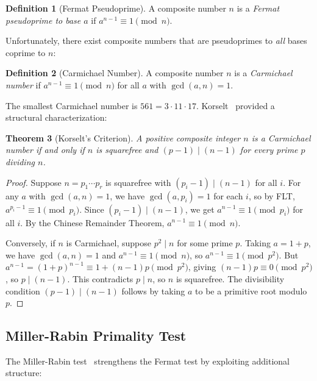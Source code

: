 \documentclass{amsart}
\theoremstyle{plain}
\newtheorem{theorem}{Theorem}[section]
\theoremstyle{definition}
\newtheorem{definition}[theorem]{Definition}
\theoremstyle{remark}
\begin{document}
\begin{definition}[Fermat Pseudoprime]
A composite number $n$ is a \emph{Fermat pseudoprime to base $a$} if $a^{n-1} \equiv 1 \pmod{n}$.
\end{definition}

Unfortunately, there exist composite numbers that are pseudoprimes to \emph{all} bases coprime to $n$:

\begin{definition}[Carmichael Number]\label{def:carmichael}
A composite number $n$ is a \emph{Carmichael number} if $a^{n-1} \equiv 1 \pmod{n}$ for all $a$ with $\gcd(a,n) = 1$.
\end{definition}

The smallest Carmichael number is $561 = 3 \cdot 11 \cdot 17$. Korselt~\cite{korselt1899} provided a structural characterization:

\begin{theorem}[Korselt's Criterion]\label{thm:korselt}
A positive composite integer $n$ is a Carmichael number if and only if $n$ is squarefree and $(p-1) \mid (n-1)$ for every prime $p$ dividing $n$.
\end{theorem}

\begin{proof}
Suppose $n = p_1 \cdots p_r$ is squarefree with $(p_i - 1) \mid (n-1)$ for all $i$. For any $a$ with $\gcd(a,n) = 1$, we have $\gcd(a, p_i) = 1$ for each $i$, so by FLT, $a^{p_i - 1} \equiv 1 \pmod{p_i}$. Since $(p_i - 1) \mid (n-1)$, we get $a^{n-1} \equiv 1 \pmod{p_i}$ for all $i$. By the Chinese Remainder Theorem, $a^{n-1} \equiv 1 \pmod{n}$.

Conversely, if $n$ is Carmichael, suppose $p^2 \mid n$ for some prime $p$. Taking $a = 1 + p$, we have $\gcd(a,n) = 1$ and $a^{n-1} \equiv 1 \pmod{n}$, so $a^{n-1} \equiv 1 \pmod{p^2}$. But $a^{n-1} = (1+p)^{n-1} \equiv 1 + (n-1)p \pmod{p^2}$, giving $(n-1)p \equiv 0 \pmod{p^2}$, so $p \mid (n-1)$. This contradicts $p \mid n$, so $n$ is squarefree. The divisibility condition $(p-1) \mid (n-1)$ follows by taking $a$ to be a primitive root modulo $p$.
\end{proof}

\subsection{Miller-Rabin Primality Test}

The Miller-Rabin test~\cite{rabin1980} strengthens the Fermat test by exploiting additional structure:
\end{document}
